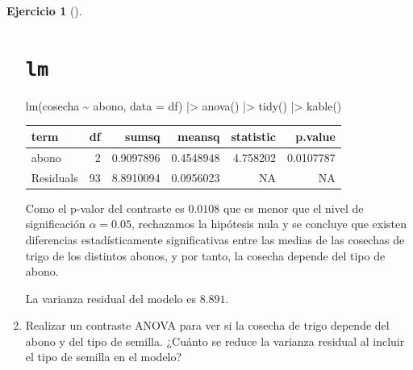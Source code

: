 \documentclass[
  a4paper,
]{scrreport}
\newenvironment{Shaded}{\begin{snugshade}}{\end{snugshade}}
\newcommand{\AttributeTok}[1]{\textcolor[rgb]{0.40,0.45,0.13}{#1}}
\newcommand{\FunctionTok}[1]{\textcolor[rgb]{0.28,0.35,0.67}{#1}}
\newcommand{\NormalTok}[1]{\textcolor[rgb]{0.00,0.23,0.31}{#1}}
\newcommand{\SpecialCharTok}[1]{\textcolor[rgb]{0.37,0.37,0.37}{#1}}
\theoremstyle{definition}
\newtheorem{exercise}{Ejercicio}[chapter]
\theoremstyle{remark}
\begin{document}
\begin{exercise}[]
\begin{enumerate}
\begin{tcolorbox}
  \section{\texorpdfstring{\texttt{lm}}{lm}}

\begin{Shaded}
\begin{Highlighting}[]
\FunctionTok{lm}\NormalTok{(cosecha }\SpecialCharTok{\textasciitilde{}}\NormalTok{ abono, }\AttributeTok{data =}\NormalTok{ df) }\SpecialCharTok{|\textgreater{}} 
    \FunctionTok{anova}\NormalTok{() }\SpecialCharTok{|\textgreater{}} 
    \FunctionTok{tidy}\NormalTok{() }\SpecialCharTok{|\textgreater{}} 
    \FunctionTok{kable}\NormalTok{()}
\end{Highlighting}
\end{Shaded}

  \begin{longtable}[]{@{}lrrrrr@{}}
  \toprule\noalign{}
  term & df & sumsq & meansq & statistic & p.value \\
  \midrule\noalign{}
  \endhead
  \bottomrule\noalign{}
  \endlastfoot
  abono & 2 & 0.9097896 & 0.4548948 & 4.758202 & 0.0107787 \\
  Residuals & 93 & 8.8910094 & 0.0956023 & NA & NA \\
  \end{longtable}

  Como el p-valor del contraste es \(0.0108\) que es menor que el nivel
  de significación \(\alpha=0.05\), rechazamos la hipótesis nula y se
  concluye que existen diferencias estadísticamente significativas entre
  las medias de las cosechas de trigo de los distintos abonos, y por
  tanto, la cosecha depende del tipo de abono.

  La varianza residual del modelo es \(8.891\).

  \end{tcolorbox}
\item
  Realizar un contraste ANOVA para ver si la cosecha de trigo depende
  del abono y del tipo de semilla. ¿Cuánto se reduce la varianza
  residual al incluir el tipo de semilla en el modelo?

  \begin{tcolorbox}[enhanced jigsaw, colframe=quarto-callout-note-color-frame, toprule=.15mm, bottomtitle=1mm, breakable, opacitybacktitle=0.6, toptitle=1mm, colback=white, bottomrule=.15mm, title=\textcolor{quarto-callout-note-color}{\faInfo}\hspace{0.5em}{Ayuda}, arc=.35mm, left=2mm, titlerule=0mm, rightrule=.15mm, coltitle=black, leftrule=.75mm, opacityback=0, colbacktitle=quarto-callout-note-color!10!white]


\end{tcolorbox}
\end{enumerate}
\end{exercise}
\end{document}
